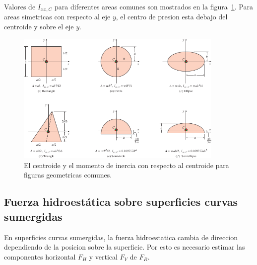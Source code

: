 \documentclass[10pt, oneside]{article}
\begin{document}
Valores de $I_{xx,C}$ para diferentes areas comunes son mostrados en la figura~\ref{centro}. Para areas simetricas con respecto al eje $y$, el centro de presion esta debajo del centroide y sobre el eje $y$.
\begin{figure}[h]
\centering
\includegraphics[width=10cm]{centro}
\caption{El centroide y el momento de inercia con respecto al centroide para figuras geometricas comunes.}
\label{centro}
\end{figure}


\subsection{Fuerza hidroest\'atica sobre superficies curvas sumergidas}
En superficies curvas sumergidas, la fuerza hidroestatica cambia de direccion dependiendo de la posicion sobre la superficie. Por esto es necesario estimar las componentes horizontal $F_H$ y vertical $F_V$ de $F_R$. 
\end{document}
